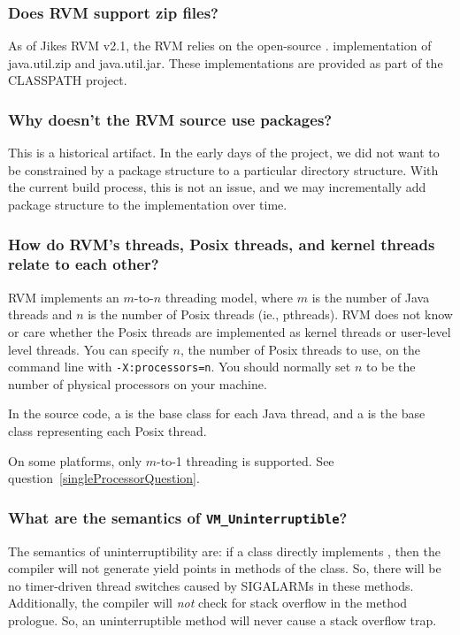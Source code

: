 \subsubsection{Does RVM support zip files?}

As of Jikes RVM v2.1, the RVM relies on the open-source
. 
implementation of java.util.zip and java.util.jar.  These implementations
are provided as part of the CLASSPATH project.

\subsubsection{Why doesn't the RVM source use packages?}

This is a historical artifact.  In the early days of the project, we did
not want to be constrained by a package structure to a particular
directory structure.  With the current build process, this is not an
issue, and we may incrementally add package structure to the
implementation over time.

\subsubsection{How do RVM's threads, Posix threads, and kernel
threads relate to each other?}

RVM implements an $m$-to-$n$ threading model, where $m$ is the number of 
Java threads and $n$ is the number of Posix threads (ie., pthreads).  RVM
does not know or care whether the Posix threads are implemented as kernel
threads or user-level level threads.  You can specify $n$, the number of
Posix threads to use, on the command line with {\tt -X:processors=n}.
You should normally set $n$ to be the number of physical processors on
your machine.  

In the source code, a 
is the base class for each Java
thread, and a 
is the base class representing each
Posix thread.  

On some platforms, only $m$-to-1 threading is supported.  See 
question~\ref{singleProcessorQuestion}.

\subsubsection{What are the semantics of {\tt VM\_Uninterruptible}?}

The semantics of uninterruptibility are: if a class 
directly implements 
, then the compiler will not
generate yield points in methods of the class.  So, there will be no
timer-driven thread switches caused by SIGALARMs in these methods.
Additionally, the compiler will {\em not} check for stack overflow in the
method prologue.  So, an uninterruptible method will never cause a stack
overflow trap.  

